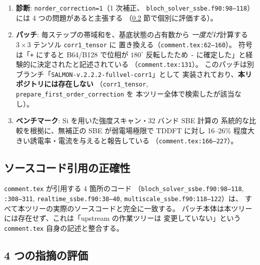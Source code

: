 \documentclass[dvipdfmx,a4paper,11pt]{jsarticle}
\newcommand{\file}[1]{\texttt{#1}}
\begin{document}
\begin{enumerate}
\item \textbf{診断}: \file{norder\_correction=1}（1 次補正、
      \file{bloch\_solver\_ssbe.f90:98--118}）には 4 つの問題があると主張する
      （\ref{sec:codex-issues} 節で個別に評価する）。
\item \textbf{パッチ}: 毎ステップの帯域和を、基底状態の占有数から
      \emph{一度だけ}計算する $3\times3$ テンソル \verb|corr1_tensor| に
      置き換える（\file{comment.tex:62--160}）。
      符号は「\texttt{+} にすると B64/B128 で位相が $180^\circ$ 反転したため
      \texttt{-} に確定した」と経験的に決定されたと記述されている
      （\file{comment.tex:131}）。
      このパッチは別ブランチ「\texttt{SALMON-v.2.2.2-fullvel-corr1}」として
      実装されており、\textbf{本リポジトリには存在しない}
      （\verb|corr1_tensor|, \verb|prepare_first_order_correction| を
      本ツリー全体で検索したが該当なし）。
\item \textbf{ベンチマーク}: Si を用いた強度スキャン・32 バンド SBE 計算の
      系統的な比較を根拠に、無補正の SBE が弱電場極限で TDDFT に対し
      16--26\% 程度大きい誘電率・電流を与えると報告している
      （\file{comment.tex:166--227}）。
\end{enumerate}

\subsection{ソースコード引用の正確性}

\file{comment.tex} が引用する 4 箇所のコード
（\file{bloch\_solver\_ssbe.f90:98--118}, \file{:308--311},
 \file{realtime\_ssbe.f90:38--40}, \file{multiscale\_ssbe.f90:118--122}）は、
すべて本ツリーの実際のソースコードと完全に一致する。
パッチ本体は本ツリーには存在せず、これは「upstream の作業ツリーは
変更していない」という \file{comment.tex} 自身の記述と整合する。

\subsection{4 つの指摘の評価}
\label{sec:codex-issues}
\end{document}

